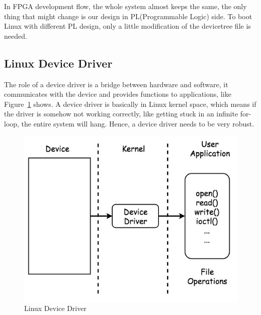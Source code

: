 In FPGA development flow, the whole system almost keeps the same, the only thing that might change 
is our design in PL(Programmable Logic) side. To boot Linux with different PL design, only 
a little modification of the devicetree file is needed.     


\subsection{Linux Device Driver}
The role of a device driver is a bridge between hardware and software, it communicates with the device and provides functions to applications, like Figure~\ref{fig:Linux Device Driver} shows. A device driver is basically in Linux kernel space, which means if the driver is somehow not working correctly, like getting stuck in an infinite for-loop, the entire system will hang. Hence, a device driver needs to be very robust. 

\begin{figure}[!htb]
  \centering
  \includegraphics[scale=0.5]{images/linux_device_driver.jpg}
  \caption[Linux Device Driver]{Linux Device Driver}
  \label{fig:Linux Device Driver}
\end{figure}



